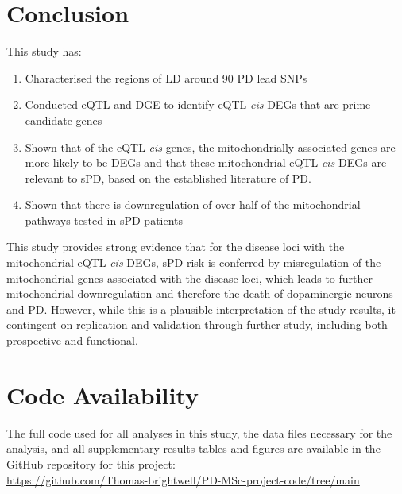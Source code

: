 \documentclass{article}
\begin{document}
\section{Conclusion}
This study has:
\begin{enumerate}
    \item Characterised the regions of LD around 90 PD lead SNPs
    \item Conducted eQTL and DGE to identify eQTL-\textit{cis}-DEGs that are prime candidate genes
    \item Shown that of the eQTL-\textit{cis}-genes, the mitochondrially associated genes are more likely to be DEGs and that these mitochondrial eQTL-\textit{cis}-DEGs are relevant to sPD, based on the established literature of PD.
    \item Shown that there is downregulation of over half of the mitochondrial pathways tested in sPD patients
\end{enumerate}
This study provides strong evidence that for the disease loci with the mitochondrial eQTL-\textit{cis}-DEGs, sPD risk is conferred by misregulation of the mitochondrial genes associated with the disease loci, which leads to further mitochondrial downregulation and therefore the death of dopaminergic neurons and PD. However, while this is a plausible interpretation of the study results, it contingent on replication and validation through further study, including both prospective and functional.
\newpage
\section{Code Availability}
The full code used for all analyses in this study, the data files necessary for the analysis, and all supplementary results tables and figures are available in the GitHub repository for this project:
\\\href{https://github.com/Thomas-brightwell/PD-MSc-project-code/tree/main}{https://github.com/Thomas-brightwell/PD-MSc-project-code/tree/main}
\newpage
\begin{singlespace}
\printbibliography
\end{singlespace}
\end{document}

